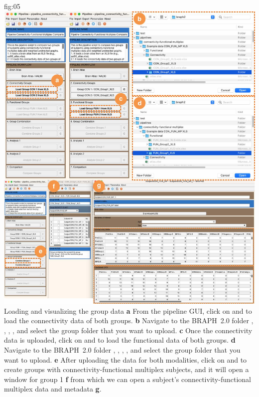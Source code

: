\documentclass[justified]{tufte-handout}
\begin{document}
	{fig:05}
	{
	\includegraphics{fig05.jpg}
	}
	{Loading and visualizing the group data}
	{
	{\bf a} From the pipeline GUI, click on  and  to load the connectivity data of both groups.
   	{\bf b} Navigate to the BRAPH~2.0 folder , , , , and select the group folder that you want to upload. 
        {\bf c} Once the connectivity data is uploaded, click on  and  to load the functional data of both groups.
   	{\bf d} Navigate to the BRAPH~2.0 folder , , , , and select the group folder that you want to upload. 
   	{\bf e} After uploading the data for both modalities, click on  and  to create groups with connectivity-functional multiplex subjects, and it will open a window for group 1 {\bf f} from which we can open a subject’s connectivity-functional
multiplex data and metadata {\bf g}.
	}
 
\end{document}
